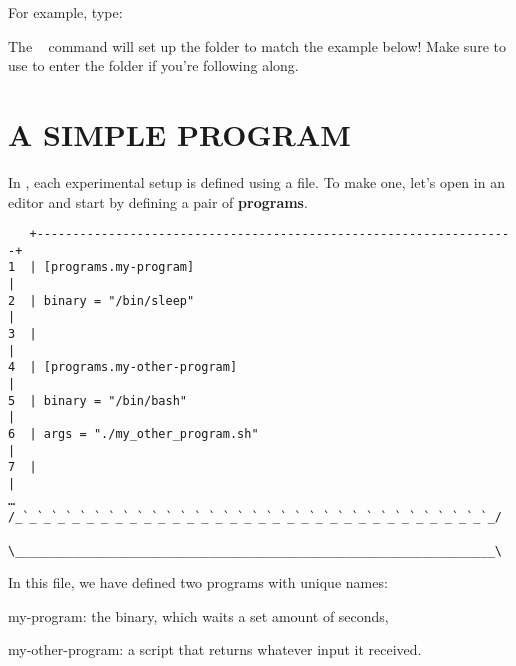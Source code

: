 \documentclass[a4paper,english]{article}
\begin{document}
    For example, type:
    ~~~~

    The ~ command will set up the  folder to match
    the example below!
    Make sure to use  to enter the folder if you're following along.


    \section{A SIMPLE PROGRAM}

    In , each experimental setup is defined using a  file.
    To make one, let's open  in an editor and start by defining a pair
    of \textbf{programs}.

    \begin{verbatim}
   +-------------------------------------------------------------------+
1  | [programs.my-program]                                             |
2  | binary = "/bin/sleep"                                             |
3  |                                                                   |
4  | [programs.my-other-program]                                       |
5  | binary = "/bin/bash"                                              |
6  | args = "./my_other_program.sh"                                     |
7  |                                                                   |
…  /_`_`_`_`_`_`_`_`_`_`_`_`_`_`_`_`_`_`_`_`_`_`_`_`_`_`_`_`_`_`_`_`_`_/
   \___________________________________________________________________\

    \end{verbatim}

    In this file, we have defined two programs with unique names:
    \begin{Description}[programs]\setlength{\itemsep}{0cm}
    \item[my-program:] the  binary, which waits a set amount of seconds,
    \item[my-other-program:] a  script that returns whatever input it received.
    \end{Description}




%
%
\end{document}

